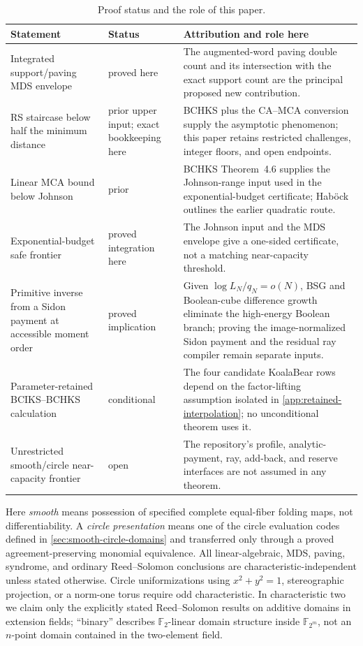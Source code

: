 \documentclass[11pt,a4paper]{amsart}
\numberwithin{equation}{section}
\theoremstyle{remark}
\newcommand{\F}{\mathbb F}
\begin{document}
\begin{table}[tbp]
\centering
\caption{Proof status and the role of this paper.}
\label{tab:novelty-status}
\small
\begin{tabularx}{\textwidth}{@{}P{0.28\textwidth}P{0.20\textwidth}Y@{}}
\toprule
Statement & Status & Attribution and role here \\
\midrule
Integrated support/paving MDS envelope & proved here &
The augmented-word paving double count and its intersection with the exact
support count are the principal proposed new contribution. \\
RS staircase below half the minimum distance & prior upper input; exact
bookkeeping here & BCHKS plus the CA--MCA conversion supply the asymptotic
phenomenon; this paper retains restricted challenges, integer floors, and
open endpoints. \\
Linear MCA bound below Johnson & prior & BCHKS Theorem~4.6 supplies the
Johnson-range input used in the exponential-budget certificate; Hab\"ock
outlines the earlier quadratic route. \\
Exponential-budget safe frontier & proved integration here & The Johnson
input and the MDS envelope give a one-sided certificate, not a matching
near-capacity threshold. \\
Primitive inverse from a Sidon payment at accessible moment order &
proved implication & Given \(\log L_N/q_N=o(N)\), BSG and Boolean-cube
difference growth eliminate the high-energy Boolean branch; proving the
image-normalized Sidon payment and the residual ray compiler remain separate
inputs. \\
Parameter-retained BCIKS--BCHKS calculation & conditional & The four
candidate KoalaBear rows depend on the factor-lifting assumption isolated in
\cref{app:retained-interpolation}; no unconditional theorem uses it. \\
Unrestricted smooth/circle near-capacity frontier & open & The repository's
profile, analytic-payment, ray, add-back, and reserve interfaces are not
assumed in any theorem. \\
\bottomrule
\end{tabularx}
\end{table}

Here \emph{smooth} means possession of specified complete equal-fiber
folding maps, not differentiability.  A \emph{circle presentation} means one
of the circle evaluation codes defined in \cref{sec:smooth-circle-domains}
and transferred only through a proved agreement-preserving monomial
equivalence.  All linear-algebraic, MDS, paving, syndrome, and ordinary
Reed--Solomon conclusions are characteristic-independent unless stated
otherwise.  Circle uniformizations using \(x^2+y^2=1\), stereographic
projection, or a norm-one torus require odd characteristic.  In
characteristic two we claim only the explicitly stated Reed--Solomon results
on additive domains in extension fields; ``binary'' describes
\(\F_2\)-linear domain structure inside \(\F_{2^m}\), not an \(n\)-point
domain contained in the two-element field.
\end{document}
